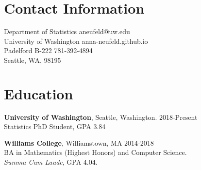 \documentclass[margin, 10pt]{res} %
\begin{document}
\begin{resume}

 

\section{Contact Information}
Department of Statistics \hfill  aneufeld@uw.edu\\
University of Washington \hfill anna-neufeld.github.io \\
Padelford B-222  \hfill 781-392-4894 \\
Seattle, WA, 98195



\section{Education} 

{\textbf{University of Washington},} Seattle, Washington. \hfill 2018-Present \\
Statistics PhD Student, GPA 3.84 

{\textbf{Williams College}}, Williamstown, MA \hfill 2014-2018  \\
BA in Mathematics (Highest Honors) and Computer Science. \\ 
\textit{Summa Cum Laude}, GPA 4.04. 
 

\end{resume}
\end{document}
